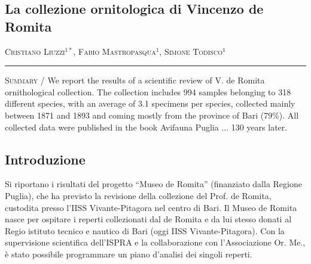 \setcounter{figure}{0}
\setcounter{table}{0}

\begin{adjustwidth}{-3.5cm}{0cm}
\pagestyle{CIOpage}
\chapter*[La collezione ornitologica di Vincenzo de Romita]{La collezione ornitologica di Vincenzo de Romita}

\textsc{Cristiano Liuzzi}$^{1*}$, \textsc{Fabio Mastropasqua}$^1$,
\textsc{Simone Todisco}$^1$ \\

  
\noindent\color{MUSEBLUE}\rule{27cm}{2pt}
\vspace{1cm}
\end{adjustwidth}



{\small
\noindent \textsc{\color{MUSEBLUE} Summary} / We report the results of a scientific review of V. de Romita
ornithological collection. The collection includes 994 samples
belonging to 318 different species, with an average of 3.1 specimens
per species, collected mainly between 1871 and 1893 and coming mostly
from the province of Bari (79\%). All collected data were published in
the book {\textquotedbl}Avifauna Puglia ... 130 years
later{\textquotedbl}.\\
}




\section*{Introduzione}
Si riportano i risultati del progetto {\textquotedblleft}Museo de
Romita{\textquotedblright} (finanziato dalla Regione Puglia), che ha
previsto la revisione della collezione del Prof. de Romita, custodita
presso l{\textquoteright}IISS Vivante-Pitagora nel centro di Bari. Il
Museo de Romita nasce per ospitare i reperti collezionati dal de Romita
e da lui stesso donati al Regio istituto tecnico e nautico di Bari
(oggi IISS Vivante-Pitagora). Con la supervisione scientifica
dell{\textquoteright}ISPRA e la collaborazione con
l{\textquoteright}Associazione Or. Me., \`e stato possibile programmare
un piano d{\textquoteright}analisi dei singoli reperti. 

